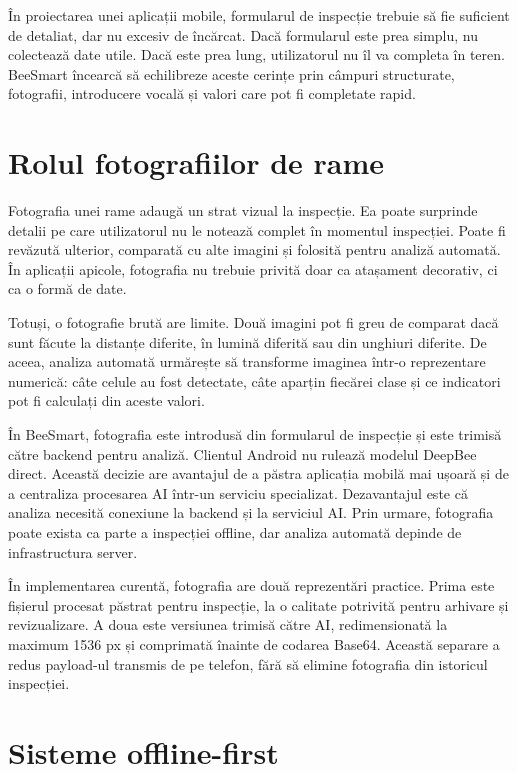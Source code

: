 În proiectarea unei aplicații mobile, formularul de inspecție trebuie să fie suficient de detaliat, dar nu excesiv de încărcat. Dacă formularul este prea simplu, nu colectează date utile. Dacă este prea lung, utilizatorul nu îl va completa în teren. BeeSmart încearcă să echilibreze aceste cerințe prin câmpuri structurate, fotografii, introducere vocală și valori care pot fi completate rapid.

\section{Rolul fotografiilor de rame}

Fotografia unei rame adaugă un strat vizual la inspecție. Ea poate surprinde detalii pe care utilizatorul nu le notează complet în momentul inspecției. Poate fi revăzută ulterior, comparată cu alte imagini și folosită pentru analiză automată. În aplicații apicole, fotografia nu trebuie privită doar ca atașament decorativ, ci ca o formă de date.

Totuși, o fotografie brută are limite. Două imagini pot fi greu de comparat dacă sunt făcute la distanțe diferite, în lumină diferită sau din unghiuri diferite. De aceea, analiza automată urmărește să transforme imaginea într-o reprezentare numerică: câte celule au fost detectate, câte aparțin fiecărei clase și ce indicatori pot fi calculați din aceste valori.

În BeeSmart, fotografia este introdusă din formularul de inspecție și este trimisă către backend pentru analiză. Clientul Android nu rulează modelul DeepBee direct. Această decizie are avantajul de a păstra aplicația mobilă mai ușoară și de a centraliza procesarea AI într-un serviciu specializat. Dezavantajul este că analiza necesită conexiune la backend și la serviciul AI. Prin urmare, fotografia poate exista ca parte a inspecției offline, dar analiza automată depinde de infrastructura server.

În implementarea curentă, fotografia are două reprezentări practice. Prima este fișierul procesat păstrat pentru inspecție, la o calitate potrivită pentru arhivare și revizualizare. A doua este versiunea trimisă către AI, redimensionată la maximum 1536 px și comprimată înainte de codarea Base64. Această separare a redus payload-ul transmis de pe telefon, fără să elimine fotografia din istoricul inspecției.

\section{Sisteme offline-first}

